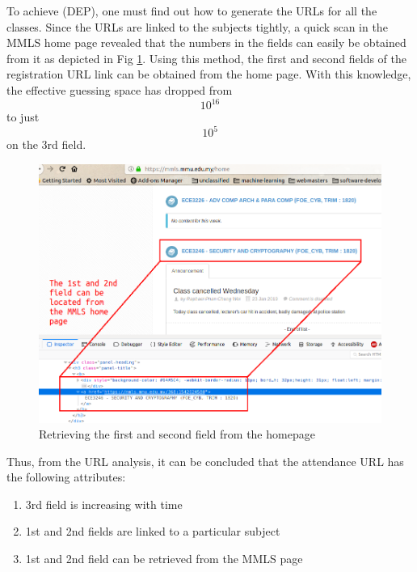 \documentclass[runningheads]{llncs}
\begin{document}
To achieve (DEP), one must find out how to generate the URLs for all the classes. Since the URLs are linked to the subjects tightly, a quick scan in the MMLS home page revealed that the numbers in the fields can easily be obtained from it as depicted in Fig \ref{fig:mmls0}. Using this method, the first and second fields of the registration URL link can be obtained from the home page. With this knowledge, the effective guessing space has dropped from \begin{equation}10^{16}\end{equation} to just \begin{equation}10^{5}\end{equation} on the 3rd field.

\clearpage{}

\begin{figure}
\includegraphics[width=\textwidth]{imgres/mmls0_edit_painted.png}
\caption{Retrieving the first and second field from the homepage}
\label{fig:mmls0}
\centering
\end{figure}

Thus, from the URL analysis, it can be concluded that the attendance URL has the following attributes: 
\begin{enumerate}
    \item 3rd field is increasing with time
    \item 1st and 2nd fields are linked to a particular subject
    \item 1st and 2nd field can be retrieved from the MMLS page
\end{enumerate}
\end{document}
